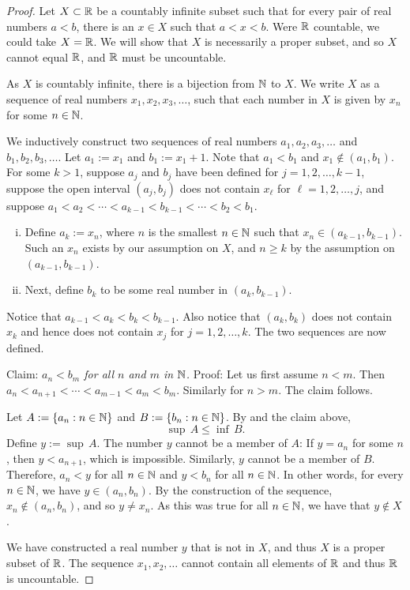 \begin{proof}
Let $X \subset {\mathbb{R}}$ be a countably infinite
subset such that for every pair of real numbers
$a < b$, there is an $x \in X$ such that $a < x < b$.  Were ${\mathbb{R}}$ countable,
we could take $X = {\mathbb{R}}$.  We will show that $X$ is necessarily
a proper subset, and so $X$ cannot equal ${\mathbb{R}}$, and ${\mathbb{R}}$ must be
uncountable.

As $X$ is countably infinite, 
there is a bijection from ${\mathbb{N}}$ to $X$.  We write $X$ as
a sequence of real numbers $x_1, x_2, x_3,\ldots$, such that
each number in $X$
is given by $x_n$ for some $n \in {\mathbb{N}}$.

We inductively
construct two sequences of real numbers $a_1,a_2,a_3,\ldots$ and
$b_1,b_2,b_3,\ldots$.  Let
$a_1 := x_1$ and $b_1 := x_1+1$.
Note that $a_1 < b_1$ and
$x_1 \notin (a_1,b_1)$.
For some $k > 1$,
suppose $a_{j}$ and $b_{j}$ have been defined
for $j=1,2,\ldots,k-1$,
suppose
the open interval $(a_{j},b_{j})$ does not contain $x_\ell$
for $\ell=1,2,\ldots,j$, and
suppose
$a_1 < a_2 < \cdots < a_{k-1} < b_{k-1} < \cdots < b_2 < b_1$.
\begin{enumerate}[(i)]
\item Define $a_k := x_n$, where $n$ is the smallest $n \in {\mathbb{N}}$
such that $x_n \in (a_{k-1},b_{k-1})$.  Such an $x_n$ exists by our
assumption on $X$, and $n \geq k$ by the assumption on $(a_{k-1},b_{k-1})$.
\item Next, define $b_k$ to be some real number in $(a_{k},b_{k-1})$.
\end{enumerate}
Notice that %
$a_{k-1} < a_k < b_k < b_{k-1}$.
Also notice that $(a_{k},b_{k})$ does not contain $x_k$ and hence
does not contain $x_j$ for $j=1,2,\ldots,k$.
The two sequences are now defined.

Claim: \emph{$a_n < b_m$ for all $n$ and $m$ in ${\mathbb{N}}$.} Proof: Let us first
assume $n < m$.  Then $a_n < a_{n+1} < \cdots < a_{m-1} < a_m < b_m$.
Similarly for $n > m$.  The claim follows.

Let $A := \{ a_n : n \in {\mathbb{N}} \}$ and $B := \{ b_n : n \in {\mathbb{N}} \}$.
By  and the claim above,
\begin{equation*}
\sup\, A \leq \inf\, B .
\end{equation*}
Define $y := \sup\, A$.  The number $y$ cannot be a member of $A$:  If $y = a_n$
for some $n$, then $y < a_{n+1}$, which is impossible.
Similarly, $y$ cannot be a member of $B$.  Therefore,
$a_n < y$ for all $n\in {\mathbb{N}}$
and $y < b_n$ for all $n\in {\mathbb{N}}$.
In other words, for every $n \in {\mathbb{N}}$, we have $y \in (a_n,b_n)$.
By the construction of the sequence, $x_n \not\in (a_n,b_n)$,
and so $y \not= x_n$.  As this was true for all $n \in {\mathbb{N}}$, we have that $y
\not\in X$.

We have constructed a real number $y$ that is not in $X$, and thus $X$
is a proper subset of ${\mathbb{R}}$.
The sequence $x_1,x_2,\ldots$ cannot contain all elements of ${\mathbb{R}}$
and thus ${\mathbb{R}}$ is uncountable.
\end{proof}

